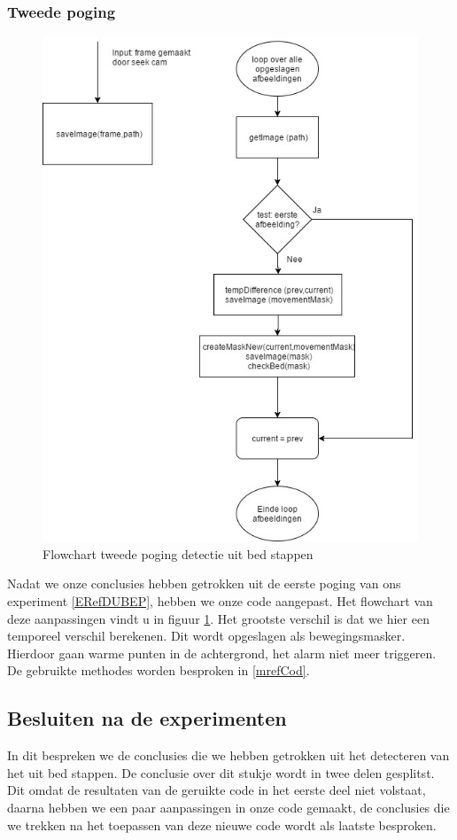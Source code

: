 \subsubsection{Tweede poging}
\label{ERefDUBTP}
\begin{figure}[h]
	\includegraphics[scale=0.45]{FlowChart_DetectUitBed_TweedePoging}
	\caption{Flowchart tweede poging detectie uit bed stappen}
	\label{imgFCDUBTP}
\end{figure}
Nadat we onze conclusies hebben getrokken uit de eerste poging van ons experiment \ref{ERefDUBEP}, hebben we onze code aangepast. Het flowchart van deze aanpassingen vindt u in figuur \ref{imgFCDUBTP}. Het grootste verschil is dat we hier een temporeel verschil berekenen. Dit wordt opgeslagen als bewegingsmasker. Hierdoor gaan warme punten in de achtergrond, het alarm niet meer triggeren. De gebruikte methodes worden besproken in \ref{mrefCod}.

\subsection{Besluiten na de experimenten}
\label{ERefDBB}
In dit bespreken we de conclusies die we hebben getrokken uit het detecteren van het uit bed stappen. De conclusie over dit stukje wordt in twee delen gesplitst. Dit omdat de resultaten van de geruikte code in het eerste deel niet volstaat, daarna hebben we een paar aanpassingen in onze code gemaakt, de conclusies die we trekken na het toepassen van deze nieuwe code wordt als laatste besproken.

